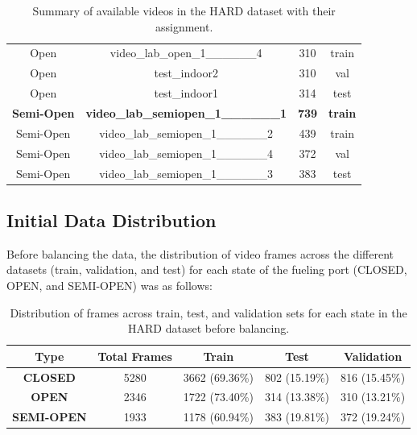 \documentclass[12pt,oneside]{book} %
\begin{document}
\begin{table}[H]
\begin{tabular}{@{}cccc@{}}
        Open               & video\_lab\_open\_1\_\_\_\_\_\_4              & 310                       & train               \\
        Open               & test\_indoor2                                 & 310                       & val                 \\
        Open               & test\_indoor1                                 & 314                       & test                \\
        \textbf{Semi-Open} & \textbf{video\_lab\_semiopen\_1\_\_\_\_\_\_1} & \textbf{739}              & \textbf{train}      \\
        Semi-Open          & video\_lab\_semiopen\_1\_\_\_\_\_\_2          & 439                       & train               \\
        Semi-Open          & video\_lab\_semiopen\_1\_\_\_\_\_\_4          & 372                       & val                 \\ 
        Semi-Open          & video\_lab\_semiopen\_1\_\_\_\_\_\_3          & 383                       & test                \\ \bottomrule
    \end{tabular}
    \caption{\centering Summary of available videos in the HARD dataset with their assignment.}
    \label{tab:video_summary}
\end{table}

\subsection{Initial Data Distribution}
Before balancing the data, the distribution of video frames across the
different datasets (train, validation, and test) for each state of the fueling
port (CLOSED, OPEN, and SEMI-OPEN) was as follows:
\begin{table}[H]
    \centering
    \begin{tabular}{@{}ccccc@{}}
        \toprule
        \textbf{Type}      & \textbf{Total Frames} & \textbf{Train} & \textbf{Test} & \textbf{Validation} \\ \midrule
        \textbf{CLOSED}    & 5280                  & 3662 (69.36\%) & 802 (15.19\%) & 816 (15.45\%)       \\ 
        \textbf{OPEN}      & 2346                  & 1722 (73.40\%) & 314 (13.38\%) & 310 (13.21\%)       \\ 
        \textbf{SEMI-OPEN} & 1933                  & 1178 (60.94\%) & 383 (19.81\%) & 372 (19.24\%)       \\ \bottomrule
    \end{tabular}
    \caption{\centering Distribution of frames across train, test, and validation sets for each state in the HARD dataset before balancing.}
    \label{tab:frame_distribution}
\end{table}
\end{document}

